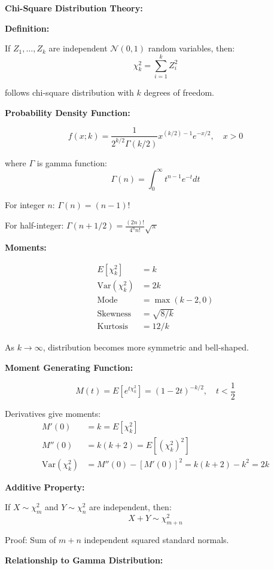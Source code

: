 \documentclass[12pt]{article}
\begin{document}
\begin{explanation}

\textbf{Chi-Square Distribution Theory:}

\textbf{Definition:}

If $Z_1, \ldots, Z_k$ are independent $\mathcal{N}(0, 1)$ random variables, then:
\[
\chi^2_k = \sum_{i=1}^k Z_i^2
\]

follows chi-square distribution with $k$ degrees of freedom.

\textbf{Probability Density Function:}

\[
f(x; k) = \frac{1}{2^{k/2}\Gamma(k/2)}x^{(k/2)-1}e^{-x/2}, \quad x > 0
\]

where $\Gamma$ is gamma function:
\[
\Gamma(n) = \int_0^\infty t^{n-1}e^{-t}dt
\]

For integer $n$: $\Gamma(n) = (n-1)!$

For half-integer: $\Gamma(n + 1/2) = \frac{(2n)!}{4^n n!}\sqrt{\pi}$

\textbf{Moments:}

\begin{align*}
E[\chi^2_k] &= k \\
\text{Var}(\chi^2_k) &= 2k \\
\text{Mode} &= \max(k-2, 0) \\
\text{Skewness} &= \sqrt{8/k} \\
\text{Kurtosis} &= 12/k
\end{align*}

As $k \to \infty$, distribution becomes more symmetric and bell-shaped.

\textbf{Moment Generating Function:}

\[
M(t) = E[e^{t\chi^2_k}] = (1 - 2t)^{-k/2}, \quad t < \frac{1}{2}
\]

Derivatives give moments:
\begin{align*}
M'(0) &= k = E[\chi^2_k] \\
M''(0) &= k(k+2) = E[(\chi^2_k)^2] \\
\text{Var}(\chi^2_k) &= M''(0) - [M'(0)]^2 = k(k+2) - k^2 = 2k
\end{align*}

\textbf{Additive Property:}

If $X \sim \chi^2_m$ and $Y \sim \chi^2_n$ are independent, then:
\[
X + Y \sim \chi^2_{m+n}
\]

Proof: Sum of $m+n$ independent squared standard normals.

\textbf{Relationship to Gamma Distribution:}


\end{explanation}
\end{document}
